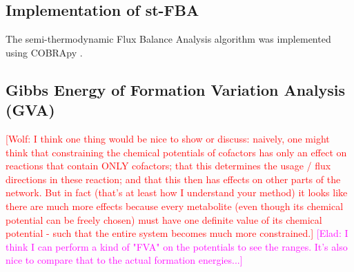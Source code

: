 \documentclass[twocolumn]{bmcart}%
\newcommand{\wolf}[1]{{\textcolor{red}{[Wolf: {#1}]}}}
\newcommand{\elad}[1]{{\textcolor{magenta}{[Elad: {#1}]}}}
\begin{document}
\subsection*{Implementation of st-FBA}
The semi-thermodynamic Flux Balance Analysis algorithm was implemented using COBRApy \cite{Ebrahim2013-vw}.


\subsection*{Gibbs Energy of Formation Variation Analysis (GVA)}

\wolf{I think one thing would be nice to show or discuss: naively, one might think that constraining the chemical potentials of cofactors has only an effect on reactions that contain ONLY cofactors; that this determines the usage / flux directions in these reaction; and that this then has effects on other parts of the network. But in fact (that's at least how I understand your method) it looks like there are much more effects because every metabolite (even though its chemical potential can be freely chosen) must have one definite value of its chemical potential - such that the entire system becomes much more constrained.}
\elad{I think I can perform a kind of "FVA" on the potentials to see the ranges. It's also nice to compare that to the actual formation energies...}
\end{document}
